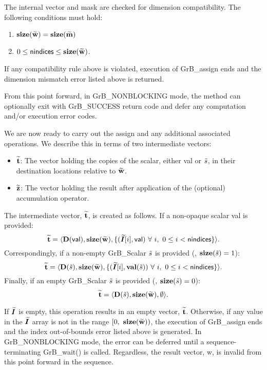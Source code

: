 The internal vector and mask are checked for dimension compatibility. 
The following conditions must hold:
\begin{enumerate}
    \item $\bold{size}({\bf \widetilde{w}}) = \bold{size}({\bf \widetilde{m}})$
    \item $0 \leq {\sf nindices} \leq \bold{size}({\bf \widetilde{w}})$.
\end{enumerate}
If any compatibility rule above is violated, execution of {\sf GrB\_assign} ends and 
the dimension mismatch error listed above is returned.

From this point forward, in {\sf GrB\_NONBLOCKING} mode, the method can 
optionally exit with {\sf GrB\_SUCCESS} return code and defer any computation 
and/or execution error codes.

We are now ready to carry out the assign and any additional 
associated operations.  We describe this in terms of two intermediate vectors:
\begin{itemize}
    \item ${\bf \widetilde{t}}$: The vector holding the copies of the scalar, either 
	{\sf val} or ${\tilde{s}}$, in their destination locations relative to 
    ${\bf \widetilde{w}}$.

    \item ${\bf \widetilde{z}}$: The vector holding the result after 
    application of the (optional) accumulation operator.
\end{itemize}

The intermediate vector, ${\bf \widetilde{t}}$, is created as follows. If a non-opaque scalar {\sf val} is provided:
\[
{\bf \widetilde{t}} = \langle
\bold{D}({\sf val}), \bold{size}({\bf \widetilde{w}}),
\{(\bm{\widetilde{I}}[i],{\sf val})\ \forall \ i,\ 0 \leq i < {\sf nindices} \} \rangle. 
\]
Correspondingly, if a non-empty {\sf GrB\_Scalar} ${\tilde{s}}$ is provided (\ie, $\mathbf{size}({\tilde{s}}) = 1$):
\[
\vector{\widetilde{t}} = \langle
\bold{D}(\scalar{\tilde{s}}), \bold{size}(\vector{\widetilde{w}}),
\{(\grbarray{\widetilde{I}}[i],\mathbf{val}(\scalar{\tilde{s}}))\ \forall \ i,\ 0 \leq i < {\sf nindices} \} \rangle. 
\]
Finally, if an empty {\sf GrB\_Scalar} ${\tilde{s}}$ is provided (\ie, $\mathbf{size}({\tilde{s}}) = 0$):
\[
{\bf \widetilde{t}} = \langle
\bold{D}({\tilde{s}}), \bold{size}({\bf \widetilde{w}}),
\emptyset \rangle. 
\]

If $\bm{\widetilde{I}}$ is empty, this operation results in an empty 
vector, ${\bf \widetilde{t}}$.  Otherwise, if any value in the 
$\bm{\widetilde{I}}$ array is not in the range 
$[0,\ \bold{size}(\vector{\widetilde{w}}) )$, the execution of {\sf GrB\_assign} 
ends and the index out-of-bounds error listed above is generated. In 
{\sf GrB\_NONBLOCKING} mode, the error can be deferred until a 
sequence-terminating {\sf GrB\_wait()} is called.  Regardless, the result 
vector, {\sf w}, is invalid from this point forward in the 
sequence.


